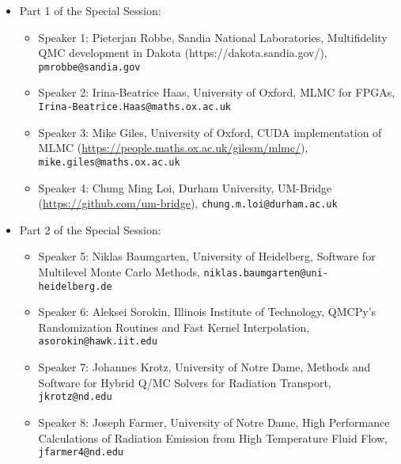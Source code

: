 \documentclass[12pt,a4paper,figuresright]{book}
\begin{document}
\begin{itemize}
\item Part 1 of the Special Session:
\begin{itemize}
    \item Speaker 1: Pieterjan Robbe, Sandia National Laboratories, Multifidelity QMC development in Dakota (https://dakota.sandia.gov/), \texttt{pmrobbe@sandia.gov}
    \item Speaker 2: Irina-Beatrice Haas, University of Oxford,  MLMC for FPGAs, \newline \texttt{Irina-Beatrice.Haas@maths.ox.ac.uk} 
    \item Speaker 3: Mike Giles, University of Oxford, CUDA implementation of MLMC (\url{https://people.maths.ox.ac.uk/gilesm/mlmc/}), \texttt{mike.giles@maths.ox.ac.uk}
    \item Speaker 4: Chung Ming Loi,  Durham University, UM-Bridge (\url{https://github.com/um-bridge}), \texttt{chung.m.loi@durham.ac.uk} %
\end{itemize}
\item Part 2 of the Special Session:
\begin{itemize}
    \item Speaker 5:  Niklas Baumgarten, University of Heidelberg, Software for Multilevel Monte Carlo Methods, \texttt{niklas.baumgarten@uni-heidelberg.de}
    \item Speaker 6: Aleksei Sorokin,  Illinois Institute of Technology, QMCPy's Randomization Routines and Fast Kernel Interpolation, \texttt{asorokin@hawk.iit.edu}
    \item Speaker 7:  Johannes Krotz, University of Notre Dame, Methods and Software for Hybrid Q/MC Solvers for Radiation Transport, \texttt{jkrotz@nd.edu} %
    \item Speaker 8: Joseph Farmer, University of Notre Dame, High Performance Calculations of Radiation Emission from High Temperature Fluid Flow, \texttt{jfarmer4@nd.edu} %

\end{itemize}
\end{itemize}


\medskip
\begin{comment}
If you would like to include references, please do so by creating a simple list numbered by [1], [2], [3], \ldots. See example below.
Please do not use the \texttt{bibliography} environment or \texttt{bibtex} files.
\begin{enumerate}
	\item[{[1]}] Niederreiter, Harald (1992). {\it Random number generation and quasi-Monte Carlo methods}. Society for Industrial and Applied Mathematics (SIAM).
	\item[{[2]}] Roberts, Gareth O, \& Rosenthal, Jeffrey S. (2002).  Optimal scaling for various Metropolis-Hastings algorithms, \textbf{16}(4), 351--367.
\end{enumerate}

Equations may be used if they are referenced. Please note that the equation numbers may be different (but will be cross-referenced correctly) in the final program book.
\end{comment}
\end{document}
